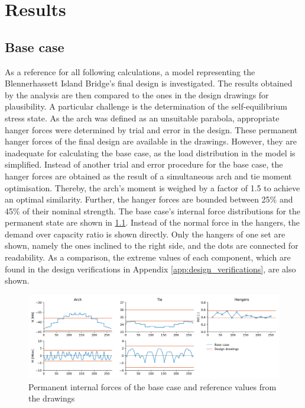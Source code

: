 \chapter{Results}\label{sec:results}

\section{Base case} \label{sec:base_case}
As a reference for all following calculations, a model representing the Blennerhassett Island Bridge's final design is investigated. The results obtained by the analysis are then compared to the ones in the design drawings for plausibility. A particular challenge is the determination of the self-equilibrium stress state. As the arch was defined as an unsuitable parabola, appropriate hanger forces were determined by trial and error in the design. These permanent hanger forces of the final design are available in the drawings. However, they are inadequate for calculating the base case, as the load distribution in the model is simplified. Instead of another trial and error procedure for the base case, the hanger forces are obtained as the result of a simultaneous arch and tie moment optimisation. Thereby, the arch's moment is weighed by a factor of 1.5 to achieve an optimal similarity. Further, the hanger forces are bounded between 25\% and 45\% of their nominal strength. The base case's internal force distributions for the permanent state are shown in \cref{fig:base_case_permanent}. Instead of the normal force in the hangers, the demand over capacity ratio is shown directly. Only the hangers of one set are shown, namely the ones inclined to the right side, and the dots are connected for readability. As a comparison, the extreme values of each component, which are found in the design verifications in Appendix \ref{app:design_verifications}, are also shown.

\begin{figure}[H]
    \centering
    \includegraphics[width=\textwidth]{calculations/Base case/Permanent state.png}
    \caption{Permanent internal forces of the base case and reference values from the drawings}
    \label{fig:base_case_permanent}
\end{figure}

